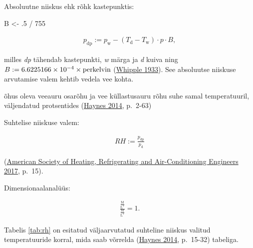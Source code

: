 \documentclass[
  12pt,
  a4paper,
  onecolumn, twoside]{article}
\newenvironment{Shaded}{\begin{snugshade}}{\end{snugshade}}
\newcommand{\DecValTok}[1]{\textcolor[rgb]{0.00,0.00,0.81}{#1}}
\newcommand{\NormalTok}[1]{#1}
\newcommand{\OtherTok}[1]{\textcolor[rgb]{0.56,0.35,0.01}{#1}}
\newcommand{\SpecialCharTok}[1]{\textcolor[rgb]{0.00,0.00,0.00}{#1}}
\providecommand{\tightlist}{%
  \setlength{\itemsep}{0pt}\setlength{\parskip}{0pt}}
\begin{document}
Absoluutne niiskus ehk rõhk kastepunktis:

\begin{Shaded}
\begin{Highlighting}[numbers=left,,]
\NormalTok{B }\OtherTok{\textless{}{-}}\NormalTok{ .}\DecValTok{5} \SpecialCharTok{/} \DecValTok{755}
\end{Highlighting}
\end{Shaded}

\begin{align}
p_\text{dp} := p_\text{w} - (T_\text{d} - T_\text{w}) \cdot p \cdot B,
\label{eq:absolute-humidity}
\end{align}

milles \emph{dp} tähendab kastepunkti, \emph{w} märga ja \emph{d} kuiva ning \(B := \ensuremath{6.6225166\times 10^{-4}} \times \unit{\\per\\kelvin}\) (\protect\hyperlink{ref-Whipple_1933}{Whipple 1933}). See absoluutse niiskuse arvutamise valem kehtib vedela vee kohta.

\begin{description}
\tightlist
\item[suhteline niiskus]
õhus oleva veeauru osarõhu ja vee küllastusauru rõhu suhe samal
temperatuuril, väljendatud protsentides (\protect\hyperlink{ref-haynes_2014_crc}{Haynes 2014}, p.~2-63)
\end{description}

Suhtelise niiskuse valem:

\begin{align}
RH := \frac{p_\text{dp}}{p_\text{d}}
\label{eq:relative-humidity}
\end{align}

(\protect\hyperlink{ref-American_Society_of_Heating_Refrigerating_and_Air-Conditioning_Engineers2017-im}{American Society of Heating, Refrigerating and Air-Conditioning Engineers 2017}, p.~15).

Dimensionaalanalüüs:

\begin{align}
\mathrm{\frac{\frac{M}{L^3}}{\frac{M}{L^3}}} = 1.
\label{eq:dimensional-analysis-for-relative-humidity}
\end{align}

Tabelis \ref{tab:rh} on esitatud väljaarvutatud suhteline niiskus valitud temperatuuride korral, mida saab võrrelda (\protect\hyperlink{ref-haynes_2014_crc}{Haynes 2014}, p.~15-32) tabeliga.
\end{document}
